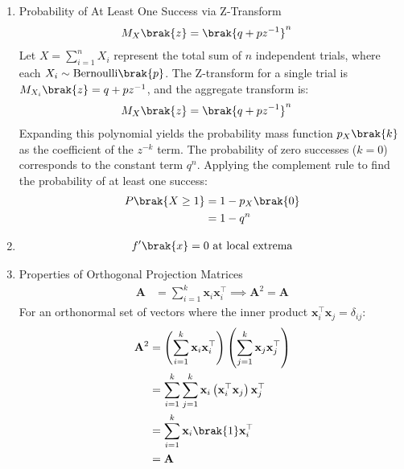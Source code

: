 \begin{enumerate}[label=\thesubsection.\arabic*, ref=\thesubsection.\theenumi]
	\item Probability of At Least One Success via Z-Transform
	\begin{align}
		M_X\brak{z} &= \brak{q + pz^{-1}}^n \label{eq:DA2025-binomial_z_transform}
	\end{align}
	Let $X = \sum_{i=1}^n X_i$ represent the total sum of $n$ independent trials, where each $X_i \sim \text{Bernoulli}\brak{p}$. The Z-transform for a single trial is $M_{X_i}\brak{z} = q + pz^{-1}$, and the aggregate transform is:
	\begin{align}
		M_X\brak{z} &= \brak{q + pz^{-1}}^n 
	\end{align}
	Expanding this polynomial yields the probability mass function $p_X\brak{k}$ as the coefficient of the $z^{-k}$ term. The probability of zero successes ($k=0$) corresponds to the constant term $q^n$. Applying the complement rule to find the probability of at least one success:
	\begin{align}
		P\brak{X \ge 1} &= 1 - p_X\brak{0}
		\\
		&= 1 - q^n \label{eq:DA2025-at_least_one}
	\end{align}
	
	\item 
	\begin{align}
		f'\brak{x} = 0 \text{ at local extrema} \label{eq:DA2025-extrema}
	\end{align}
	
	\item Properties of Orthogonal Projection Matrices
	\begin{align}
		\mathbf{A} &= \sum_{i=1}^k \mathbf{x}_i \mathbf{x}_i^\top \implies \mathbf{A}^2 = \mathbf{A} \label{eq:DA2025-orthogonal_projection}
	\end{align}
	\solution
	For an orthonormal set of vectors where the inner product $\mathbf{x}_i^\top \mathbf{x}_j = \delta_{ij}$:
	\begin{align}
		\mathbf{A}^2 &= \left(\sum_{i=1}^k \mathbf{x}_i \mathbf{x}_i^\top\right) \left(\sum_{j=1}^k \mathbf{x}_j \mathbf{x}_j^\top\right)
		\\
		&= \sum_{i=1}^k \sum_{j=1}^k \mathbf{x}_i \left(\mathbf{x}_i^\top \mathbf{x}_j\right) \mathbf{x}_j^\top
		\\
		&= \sum_{i=1}^k \mathbf{x}_i \brak{1} \mathbf{x}_i^\top
		\\
		&= \mathbf{A}
	\end{align}
	

\end{enumerate}
